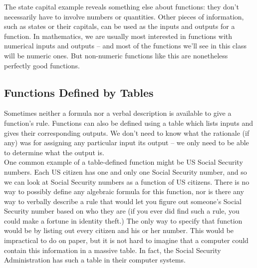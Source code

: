 

The state capital example reveals something else about functions: they don’t necessarily have to involve numbers or quantities. Other pieces of information, such as states or their capitals, can be used as the inputs and outputs for a function. In mathematics, we are usually most interested in functions with numerical inputs and outputs – and most of the functions we’ll see in this class will be numeric ones. But non-numeric functions like this are nonetheless perfectly good functions.

%
%

\subsection{Functions Defined by Tables}

Sometimes neither a formula nor a verbal description is available to give a function’s rule. Functions can also be defined using a table which lists inputs and gives their corresponding outputs. We don’t need to know what the rationale (if any) was for assigning any particular input its output -- we only need to be able to determine what the output is.\\

One common example of a table-defined function might be US Social Security numbers. Each US citizen has one and only one Social Security number, and so we can look at Social Security numbers as a function of US citizens. There is no way to possibly define any algebraic formula for this function, nor is there any way to verbally describe a rule that would let you figure out someone’s Social Security number based on who they are (if you ever did find such a rule, you could make a
fortune in identity theft.) The only way to specify that function would be by listing out every citizen and his or her number. This would be impractical to do on paper, but it is not hard to imagine that a computer could contain this information in a massive table. In fact, the Social Security Administration has such a table in their computer systems.\\


